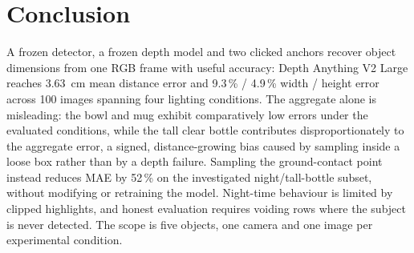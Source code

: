 \documentclass[conference]{IEEEtran}
\begin{document}
\section{Conclusion}
A frozen detector, a frozen depth model and two clicked anchors recover object
dimensions from one RGB frame with useful accuracy: Depth Anything V2 Large
reaches 3.63~cm mean distance error and 9.3\,\% / 4.9\,\% width / height error
across 100 images spanning four lighting conditions. The
aggregate alone is misleading: the bowl and mug exhibit comparatively low errors
under the evaluated conditions, while the tall clear bottle contributes
disproportionately to the aggregate error, a signed,
distance-growing bias caused by sampling
inside a loose box rather than by a depth failure. Sampling the ground-contact
point instead reduces MAE by 52\,\% on the investigated night/tall-bottle
subset, without modifying or retraining the model. Night-time behaviour is
limited by clipped highlights, and honest evaluation requires voiding rows where
the subject is never detected. The scope is five objects, one camera and one
image per experimental condition.



\clearpage
\end{document}

